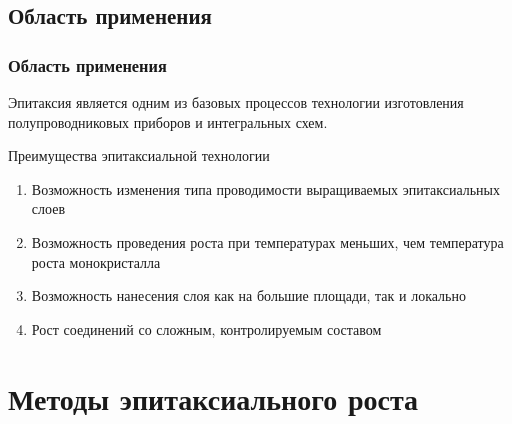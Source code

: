 \documentclass[10pt,pdf,hyperref={unicode}, dvipsnames]{beamer}
\begin{document}
\subsection{Область применения}
\begin{frame}[t]
	\frametitle{Область применения}
	Эпитаксия является одним из базовых процессов технологии изготовления полупроводниковых приборов и интегральных
	схем.
	\vspace{20pt}

	Преимущества эпитаксиальной технологии
	\begin{enumerate}
		\item Возможность изменения типа проводимости выращиваемых эпитаксиальных слоев
		\item Возможность проведения роста при температурах меньших, чем температура роста монокристалла
		\item Возможность нанесения слоя как на большие площади, так и локально
		\item Рост соединений со сложным, контролируемым составом
	\end{enumerate}

\end{frame}



\section{Методы эпитаксиального роста}
\end{document}
